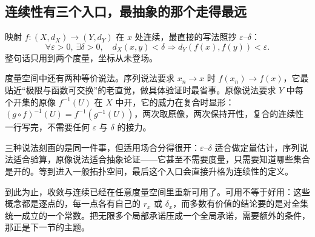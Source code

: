 \subsection{连续性有三个入口，最抽象的那个走得最远}

映射 \(f:(X,d_X)\to(Y,d_Y)\) 在 \(x\) 处连续，最直接的写法照抄 \(\varepsilon\)--\(\delta\)：
\[
\forall\varepsilon>0,\ \exists\delta>0,\quad d_X(x,y)<\delta\Longrightarrow d_Y(f(x),f(y))<\varepsilon.
\]
整句话只用到两个度量，坐标从未登场。

度量空间中还有两种等价说法。序列说法要求 \(x_n\to x\) 时 \(f(x_n)\to f(x)\)，它最贴近``极限与函数可交换''的老直觉，做具体验证时最省事。原像说法要求 \(Y\) 中每个开集的原像 \(f^{-1}(U)\) 在 \(X\) 中开，它的威力在复合时显形：\((g\circ f)^{-1}(U)=f^{-1}(g^{-1}(U))\)，两次取原像，两次保持开性，复合的连续性一行写完，不需要任何 \(\varepsilon\) 与 \(\delta\) 的接力。

三种说法刻画的是同一件事，但适用场合分得很开：\(\varepsilon\)--\(\delta\) 适合做定量估计，序列说法适合验算，原像说法适合抽象论证——它甚至不需要度量，只需要知道哪些集合是开的。等到进入一般拓扑空间，最后这个入口会直接升格为连续性的定义。

到此为止，收敛与连续已经在任意度量空间里重新可用了。可用不等于好用：这些概念都是逐点的，每一点各有自己的 \(r_x\) 或 \(\delta_x\)，而多数有价值的结论要的是对全集统一成立的一个常数。把无限多个局部承诺压成一个全局承诺，需要额外的条件，那正是下一节的主题。

